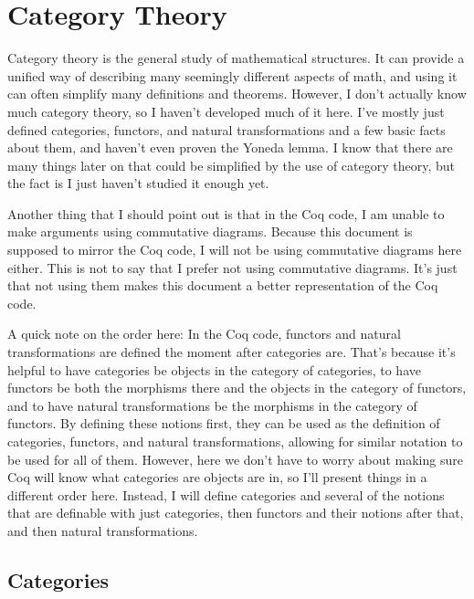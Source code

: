 \documentclass[../math.tex]{subfiles}
\begin{document}
\setcounter{chapter}{5}

\chapter{Category Theory}

Category theory is the general study of mathematical structures.  It can provide
a unified way of describing many seemingly different aspects of math, and using
it can often simplify many definitions and theorems.  However, I don't actually
know much category theory, so I haven't developed much of it here.  I've mostly
just defined categories, functors, and natural transformations and a few basic
facts about them, and haven't even proven the Yoneda lemma.  I know that there
are many things later on that could be simplified by the use of category theory,
but the fact is I just haven't studied it enough yet.

Another thing that I should point out is that in the Coq code, I am unable to
make arguments using commutative diagrams.  Because this document is supposed to
mirror the Coq code, I will not be using commutative diagrams here either.  This
is not to say that I prefer not using commutative diagrams.  It's just that not
using them makes this document a better representation of the Coq code.

A quick note on the order here: In the Coq code, functors and natural
transformations are defined the moment after categories are.  That's because
it's helpful to have categories be objects in the category of categories, to
have functors be both the morphisms there and the objects in the category of
functors, and to have natural transformations be the morphisms in the category
of functors.  By defining these notions first, they can be used as the
definition of categories, functors, and natural transformations, allowing for
similar notation to be used for all of them.  However, here we don't have to
worry about making sure Coq will know what categories are objects are in, so
I'll present things in a different order here.  Instead, I will define
categories and several of the notions that are definable with just categories,
then functors and their notions after that, and then natural transformations.

\section{Categories}
\end{document}
